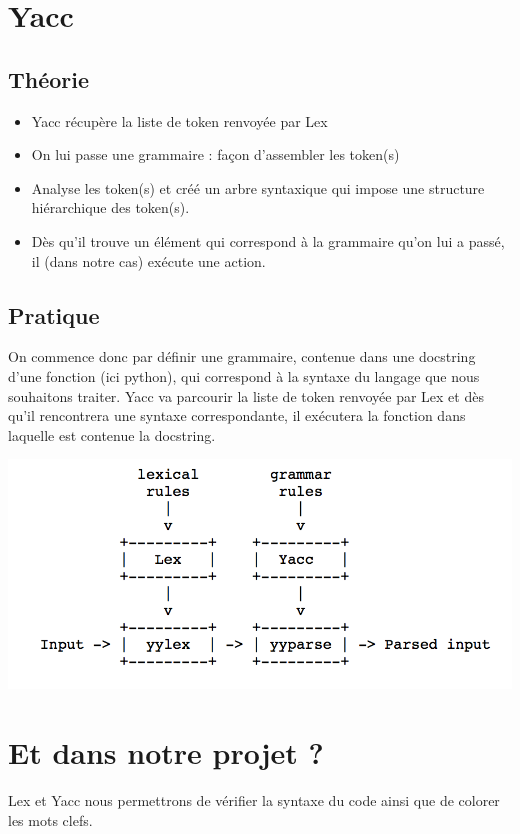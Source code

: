 \documentclass[a4paper,12pt]{article}
\begin{document}
\section{Yacc}

	\subsection{Théorie}
	\begin{itemize}
		\item Yacc récupère la liste de token renvoyée par Lex
		\item On lui passe une grammaire : façon d'assembler les token(s)
		\item Analyse les token(s) et créé un arbre syntaxique qui impose une structure hiérarchique des token(s).
		\item Dès qu'il trouve un élément qui correspond à la grammaire qu'on lui a passé, il (dans notre cas) exécute une action.
	\end{itemize}	 	
	
	\subsection{Pratique}
	
	On commence donc par définir une grammaire, contenue dans une docstring d'une fonction (ici python), qui correspond à la syntaxe du langage que nous souhaitons traiter. Yacc va parcourir la liste de token renvoyée par Lex et dès qu'il rencontrera une syntaxe correspondante, il exécutera la fonction dans laquelle est contenue la docstring. 
	\vspace{0.5cm}
	\begin{center}
		\includegraphics[scale=0.6]{images/schema_lex_yacc}
	\end{center}

\section{Et dans notre projet ?}

	Lex et Yacc nous permettrons de vérifier la syntaxe du code ainsi que de colorer les mots clefs.
\end{document}

